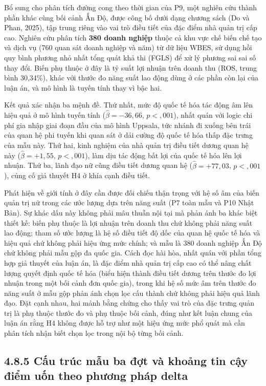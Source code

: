 \documentclass[
  a4paper,
  13pt]{extreport}
\begin{document}
Bổ sung cho phân tích đường cong theo thời gian của P9, một nghiên cứu
thành phần khác cùng bối cảnh Ấn Độ, được công bố dưới dạng chương sách
(Do và Phan, 2025), tập trung riêng vào vai trò điều tiết của đặc điểm
nhà quản trị cấp cao. Nghiên cứu phân tích \textbf{380 doanh nghiệp}
thuộc cả khu vực chế biến chế tạo và dịch vụ (760 quan sát doanh nghiệp
và năm) từ dữ liệu WBES, sử dụng hồi quy bình phương nhỏ nhất tổng quát
khả thi (FGLS) để xử lý phương sai sai số thay đổi. Biến phụ thuộc ở đây
là tỷ suất lợi nhuận trên doanh thu (ROS, trung bình 30,34\%), khác với
thước đo năng suất lao động dùng ở các phần còn lại của luận án, và mô
hình là tuyến tính thay vì bậc hai.

Kết quả xác nhận ba mệnh đề. Thứ nhất, mức độ quốc tế hóa tác động âm
lên hiệu quả ở mô hình tuyến tính (\(\hat{\beta} = -36{,}66\),
\(p < {,}001\)), nhất quán với logic chi phí gia nhập giai đoạn đầu của
mô hình Uppsala, tức nhánh đi xuống bên trái của quan hệ phi tuyến khi
quan sát ở dải cường độ quốc tế hóa thấp đặc trưng của mẫu này. Thứ hai,
kinh nghiệm của nhà quản trị điều tiết dương quan hệ này
(\(\hat{\beta} = +1{,}55\), \(p < {,}001\)), làm dịu tác động bất lợi
của quốc tế hóa lên lợi nhuận. Thứ ba, lãnh đạo nữ cũng điều tiết dương
quan hệ (\(\hat{\beta} = +77{,}03\), \(p < {,}001\)), củng cố giả thuyết
H4 ở khía cạnh điều tiết.

Phát hiện về giới tính ở đây cần được đối chiếu thận trọng với hệ số âm
của biến quản trị nữ trong các ước lượng dựa trên năng suất (P7 toàn mẫu
và P10 Nhật Bản). Sự khác dấu này không phải mâu thuẫn nội tại mà phản
ánh ba khác biệt thiết kế: biến phụ thuộc là lợi nhuận trên doanh thu
chứ không phải năng suất lao động; tham số ước lượng là hệ số điều tiết
độ dốc của quan hệ quốc tế hóa và hiệu quả chứ không phải hiệu ứng mức
chính; và mẫu là 380 doanh nghiệp Ấn Độ chứ không phải mẫu gộp đa quốc
gia. Cách đọc hài hòa, nhất quán với phần tổng hợp giả thuyết của luận
án, là đặc điểm nhà quản trị cấp cao có thể nâng chất lượng quyết định
quốc tế hóa (biểu hiện thành điều tiết dương trên thước đo lợi nhuận
trong một bối cảnh đơn quốc gia), trong khi hệ số mức âm trên thước đo
năng suất ở mẫu gộp phản ánh chọn lọc cấu thành chứ không phải hiệu quả
lãnh đạo. Đặt cạnh nhau, hai mảnh bằng chứng cho thấy vai trò của đặc
trưng quản trị là phụ thuộc thước đo và phụ thuộc bối cảnh, đúng như kết
luận chung của luận án rằng H4 không được hỗ trợ như một hiệu ứng mức
phổ quát mà cần phân tích nhận biết chọn lọc trong nội bộ từng bối cảnh.

\hypertarget{cux1ea5u-truxfac-mux1eabu-ba-ux111ux1ee3t-vuxe0-khoux1ea3ng-tin-cux1eady-ux111iux1ec3m-uux1ed1n-theo-phux1b0ux1a1ng-phuxe1p-delta}{%
\subsection{4.8.5 Cấu trúc mẫu ba đợt và khoảng tin cậy điểm uốn theo
phương pháp
delta}\label{cux1ea5u-truxfac-mux1eabu-ba-ux111ux1ee3t-vuxe0-khoux1ea3ng-tin-cux1eady-ux111iux1ec3m-uux1ed1n-theo-phux1b0ux1a1ng-phuxe1p-delta}}
\end{document}
